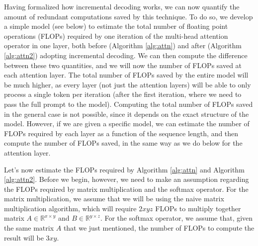 Having formalized how incremental decoding works, we can now quantify the amount of redundant computations saved by this technique. To do so, we develop a simple model (see below) to estimate the total number of floating point operations (FLOPs) required by one iteration of the multi-head attention operator in one layer, both before (Algorithm \ref{alg:attn}) and after (Algorithm \ref{alg:attn2}) adopting incremental decoding. We can then compute the difference between these two quantities, and we will now the number of FLOPs saved at each attention layer. The total number of FLOPs saved by the entire model will be much higher, as every layer (not just the attention layers) will be able to only process a single token per iteration (after the first iteration, where we need to pass the full prompt to the model). Computing the total number of FLOPs saved in the general case is not possible, since it depends on the exact structure of the model. However, if we are given a specific model, we can estimate the number of FLOPs required by each layer as a function of the sequence length, and then compute the number of FLOPs saved, in the same way as we do below for the attention layer.

Let's now estimate the FLOPs required by Algorithm \ref{alg:attn} and Algorithm \ref{alg:attn2}. Before we begin, however, we need to make an assumption regarding the FLOPs required by matrix multiplication and the softmax operator.  For the matrix multiplication, we assume that we will be using the naive matrix multiplication algorithm, which will require $2xyz$ FLOPs to multiply together matrix $A\in \mathbb{R}^{x \times y}$ and $B\in \mathbb{R}^{y \times z}$. For the softmax operator, we assume that, given the same matrix $A$ that we just mentioned, the number of FLOPs to compute the result will be $3xy$. 

